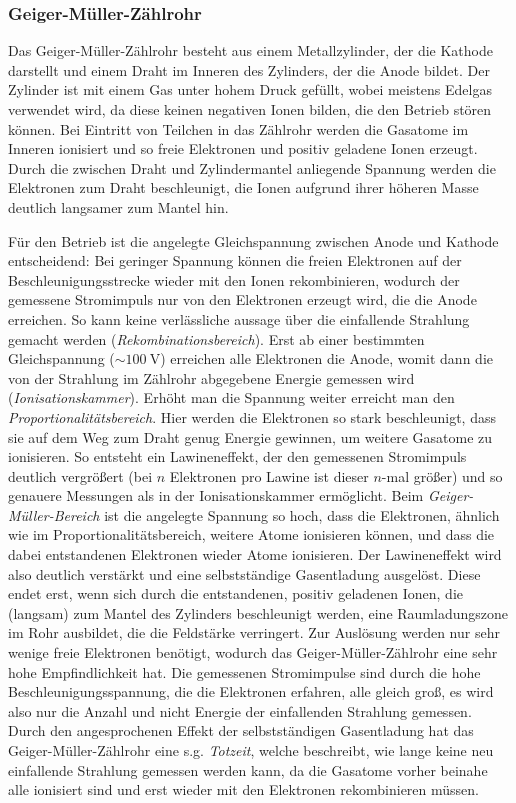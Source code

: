 \documentclass[11pt, a4paper]{article}
\begin{document}
\subsubsection{Geiger-Müller-Zählrohr}
Das Geiger-Müller-Zählrohr besteht aus einem Metallzylinder, der die Kathode darstellt und einem Draht im Inneren des Zylinders, der die Anode bildet.
Der Zylinder ist mit einem Gas unter hohem Druck gefüllt, wobei meistens Edelgas verwendet wird, da diese keinen negativen Ionen bilden, die den Betrieb stören können.
Bei Eintritt von Teilchen in das Zählrohr werden die Gasatome im Inneren ionisiert und so freie Elektronen und positiv geladene Ionen erzeugt.
Durch die zwischen Draht und Zylindermantel anliegende Spannung werden die Elektronen zum Draht beschleunigt, die Ionen aufgrund ihrer höheren Masse deutlich langsamer zum Mantel hin.

Für den Betrieb ist die angelegte Gleichspannung zwischen Anode und Kathode entscheidend:
Bei geringer Spannung können die freien Elektronen auf der Beschleunigungsstrecke wieder mit den Ionen rekombinieren, wodurch der gemessene Stromimpuls nur von den Elektronen erzeugt wird, die die Anode erreichen.
So kann keine verlässliche aussage über die einfallende Strahlung gemacht werden (\emph{Rekombinationsbereich}).
Erst ab einer bestimmten Gleichspannung ($\sim \SI{100}{\volt}$) erreichen alle Elektronen die Anode, womit dann die von der Strahlung im Zählrohr abgegebene Energie gemessen wird (\emph{Ionisationskammer}).
Erhöht man die Spannung weiter erreicht man den \emph{Proportionalitätsbereich}.
Hier werden die Elektronen so stark beschleunigt, dass sie auf dem Weg zum Draht genug Energie gewinnen, um weitere Gasatome zu ionisieren.
So entsteht ein Lawineneffekt, der den gemessenen Stromimpuls deutlich vergrößert (bei $n$ Elektronen pro Lawine ist dieser $n$-mal größer) und so genauere Messungen als in der Ionisationskammer ermöglicht.
Beim \emph{Geiger-Müller-Bereich} ist die angelegte Spannung so hoch, dass die Elektronen, ähnlich wie im Proportionalitätsbereich, weitere Atome ionisieren können, und dass die dabei entstandenen Elektronen wieder Atome ionisieren.
Der Lawineneffekt wird also deutlich verstärkt und eine selbstständige Gasentladung ausgelöst.
Diese endet erst, wenn sich durch die entstandenen, positiv geladenen Ionen, die (langsam) zum Mantel des Zylinders beschleunigt werden, eine Raumladungszone im Rohr ausbildet, die die Feldstärke verringert.
Zur Auslösung werden nur sehr wenige freie Elektronen benötigt, wodurch das Geiger-Müller-Zählrohr eine sehr hohe Empfindlichkeit hat.
Die gemessenen Stromimpulse sind durch die hohe Beschleunigungsspannung, die die Elektronen erfahren, alle gleich groß, es wird also nur die Anzahl und nicht Energie der einfallenden Strahlung gemessen.
Durch den angesprochenen Effekt der selbstständigen Gasentladung hat das Geiger-Müller-Zählrohr eine s.g. \emph{Totzeit}, welche beschreibt, wie lange keine neu einfallende Strahlung gemessen werden kann, da die Gasatome vorher beinahe alle ionisiert sind und erst wieder mit den Elektronen rekombinieren müssen.
\end{document}

